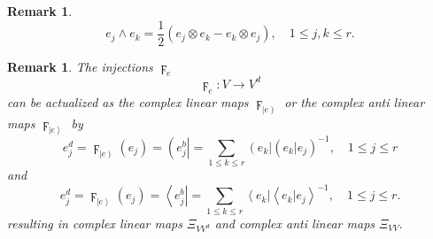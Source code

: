 \documentclass[aps,preprint]{revtex4}%
\newtheorem{remark}[theorem]{Remark}
\begin{document}
\begin{remark}%
\begin{equation}
e_{j}\wedge e_{k}=\frac{1}{2}\left(  e_{j}\otimes e_{k}-e_{k}\otimes
e_{j}\right)  ,\quad1\leq j,k\leq r.
\end{equation}

\end{remark}

\begin{remark}
The injections $\digamma_{e}$
\begin{equation}
\digamma_{e}:V\rightarrow V^{d}%
\end{equation}
can be actualized as the complex linear maps $\digamma_{\left\vert e\right)
}$ or the complex anti linear maps $\digamma_{\left\vert e\right\rangle }$ by
\begin{equation}
e_{j}^{d}=\digamma_{\left\vert e\right)  }\left(  e_{j}\right)  =\left(
e_{j}^{b}\right\vert =\sum_{1\leq k\leq r}\left(  e_{k}\right\vert \left(
\left.  e_{k}\right\vert e_{j}\right)  ^{-1},\quad1\leq j\leq r
\end{equation}
and
\begin{equation}
e_{j}^{d}=\digamma_{\left\vert e\right\rangle }\left(  e_{j}\right)
=\left\langle e_{j}^{b}\right\vert =\sum_{1\leq k\leq r}\left\langle
e_{k}\right\vert \left\langle \left.  e_{k}\right\vert e_{j}\right\rangle
^{-1},\quad1\leq j\leq r.
\end{equation}
resulting in complex linear maps $\mathcal{\Xi}_{VV^{d}}$ and complex anti
linear maps $\mathcal{\Xi}_{VV}.$
\end{remark}
\end{document}
